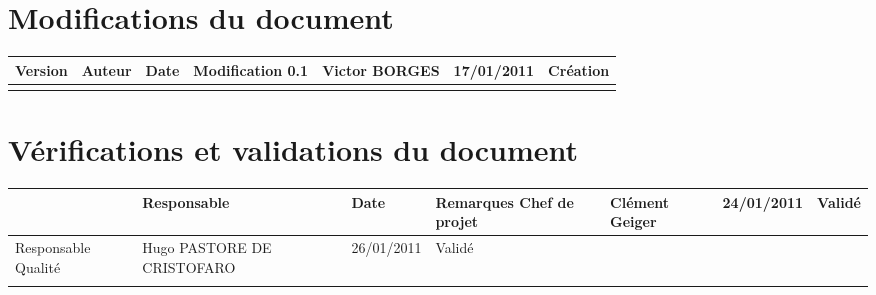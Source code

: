 
\section*{Modifications du document}

\begin{center}
\begin{longtable}{|m{14mm}||m{36mm}|m{36mm}|m{60mm}|}
\hline
Version & Auteur & Date & Modification\endhead \hline
0.1
& %
Victor BORGES
& %
17/01/2011
& %
Création
\\\hline

& %

& %

& %

\\\hline
\end{longtable}
\end{center}


\section*{Vérifications et validations du document}

\begin{center}
\begin{longtable}{|m{15mm}|m{36mm}|m{36mm}|m{60mm}|}
\hline
 & Responsable & Date & Remarques\endhead \hline
Chef de projet
& %
Clément Geiger
& %
24/01/2011
& %
Validé
\\\hline
Responsable Qualité
& %
Hugo PASTORE DE CRISTOFARO
& %
26/01/2011
& %
Validé
\\\hline

& %

& %

& %

\\\hline
\end{longtable}
\end{center}

\pagebreak

